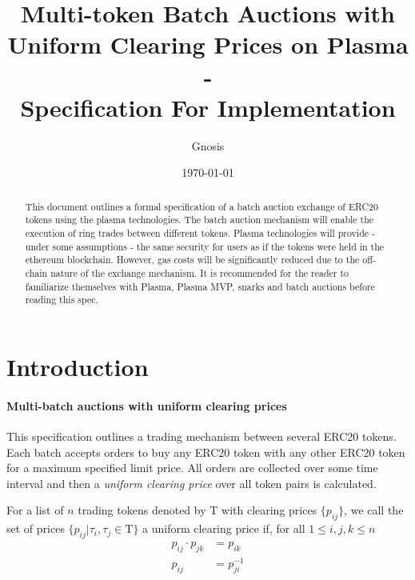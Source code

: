 \documentclass[11pt,parskip=full]{scrartcl}%
\title{
  Multi-token Batch Auctions with Uniform Clearing Prices on Plasma\\
  - \\
  \Large Specification For Implementation}
\author{Gnosis}
\date{\today}
\newcommand{\Tau}{\mathrm{T}}
\newcommand*{\erc}{ERC20 }
\begin{document}
\maketitle


\begin{abstract}

This document outlines a formal specification of a batch auction exchange of ERC20 tokens using the plasma technologies. 
The batch auction mechanism will enable the execution of ring trades between different tokens. 
Plasma technologies will provide - under some assumptions - the same security for users as if the tokens were held in the ethereum blockchain. 
However, gas costs will be significantly reduced due to the off-chain nature of the exchange mechanism. 
It is recommended for the reader to familiarize themselves with Plasma\cite{plasma}, Plasma MVP\cite{MVP}, snarks\cite{snarks} and batch auctions\cite{batch} before reading this spec. 

\end{abstract}

\tableofcontents

\newpage
\section{Introduction}
\label{sec:introduction}

\paragraph{Multi-batch auctions with uniform clearing prices}

This specification outlines a trading mechanism between several \erc tokens. Each batch accepts orders to buy any \erc token with any other \erc token for a maximum specified limit price. All orders are collected over some time interval and then a \emph{uniform clearing price} over all token pairs is calculated. 

For a list of $n$ trading tokens denoted by $\Tau$ with clearing prices $\{p_{ij}\}$, we call the set of prices $\{p_{ij}| \tau_i, \tau_j \in \Tau\}$ a uniform clearing price if, for all $1 \leq i, j, k \leq n$
\begin{align} \label{arbitrage_free}
  p_{ij} \cdot p_{jk} &= p_{ik}\\
  p_{ij} &= p_{ji}^{-1}
\end{align}
\end{document}
